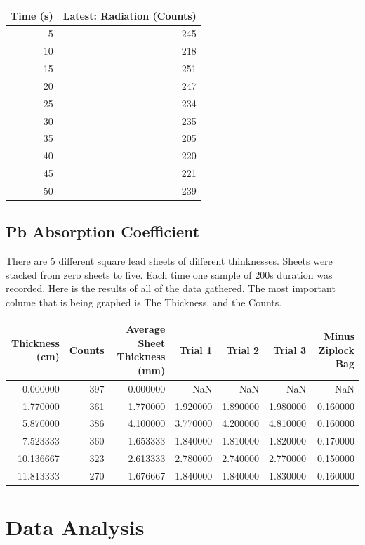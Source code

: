 \documentclass[12pt,letterpaper]{article}
\begin{document}
\begin{tabular}{rr}
\toprule
Time (s) & Latest: Radiation (Counts) \\
\midrule
5 & 245 \\
10 & 218 \\
15 & 251 \\
20 & 247 \\
25 & 234 \\
30 & 235 \\
35 & 205 \\
40 & 220 \\
45 & 221 \\
50 & 239 \\
\bottomrule
\end{tabular}

\subsection{Pb Absorption Coefficient}

There are 5 different square lead sheets of different
thinknesses. Sheets were stacked from zero sheets
to five. Each time one sample of 200s duration was 
recorded. Here is the results of all of the data gathered.
The most important colume that is being graphed is
The Thickness, and the Counts.

\begin{tabular}{rrrrrrr}
\toprule
Thickness (cm) & Counts & Average Sheet Thickness (mm) & Trial 1 & Trial 2 & Trial 3 & Minus Ziplock Bag \\
\midrule
0.000000 & 397 & 0.000000 & NaN & NaN & NaN & NaN \\
1.770000 & 361 & 1.770000 & 1.920000 & 1.890000 & 1.980000 & 0.160000 \\
5.870000 & 386 & 4.100000 & 3.770000 & 4.200000 & 4.810000 & 0.160000 \\
7.523333 & 360 & 1.653333 & 1.840000 & 1.810000 & 1.820000 & 0.170000 \\
10.136667 & 323 & 2.613333 & 2.780000 & 2.740000 & 2.770000 & 0.150000 \\
11.813333 & 270 & 1.676667 & 1.840000 & 1.840000 & 1.830000 & 0.160000 \\
\bottomrule
\end{tabular}



\section{Data Analysis}
\end{document}
